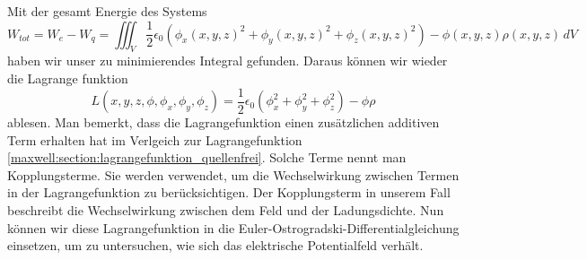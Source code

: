Mit der gesamt Energie des Systems
\[
W_{tot}
=
W_e - W_q
=
\iiint_V \frac{1}{2}\epsilon_0\left(\phi_x(x,y,z)^2 + \phi_y(x,y,z)^2 + \phi_z(x,y,z)^2\right) - \phi(x,y,z)\rho(x,y,z)\, dV
\]
haben wir unser zu minimierendes Integral gefunden.
Daraus können wir wieder die Lagrange funktion
\begin{equation}
L(x,y,z,\phi,\phi_x,\phi_y,\phi_z)
=
\frac{1}{2}\epsilon_0\left(\phi_x^2 + \phi_y^2 + \phi_z^2\right) - \phi\rho
\label{maxwell:section:lagrangefunktion_mit_quelle}
\end{equation}
ablesen.
Man bemerkt, dass die Lagrangefunktion einen zusätzlichen additiven Term erhalten hat im Verlgeich zur Lagrangefunktion \eqref{maxwell:section:lagrangefunktion_quellenfrei}.
Solche Terme nennt man Kopplungsterme.
Sie werden verwendet, um die Wechselwirkung zwischen Termen in der Lagrangefunktion zu berücksichtigen.
Der Kopplungsterm in unserem Fall beschreibt die Wechselwirkung zwischen dem Feld und der Ladungsdichte.
Nun können wir diese Lagrangefunktion in die Euler-Ostrogradski-Differentialgleichung einsetzen, um zu untersuchen, wie sich das elektrische Potentialfeld verhält.


